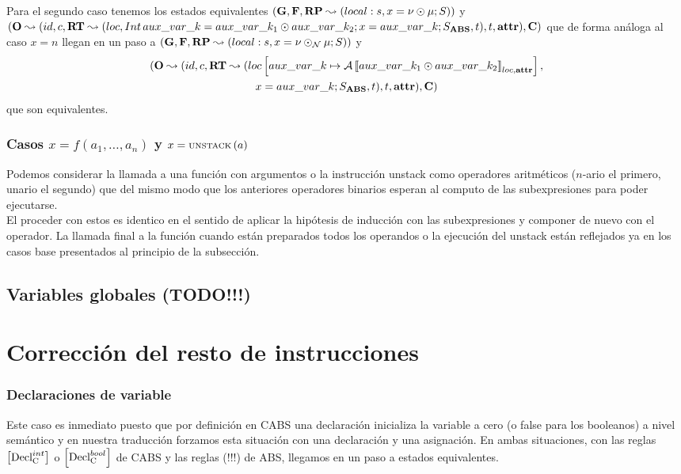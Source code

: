 Para el segundo caso tenemos los estados equivalentes $(\mathbf{G}, \mathbf{F}, \textbf{RP} \leadsto (local:s,x = \nu \odot \mu\mbox{;\,}S))$ y $(\mathbf{O} \leadsto (id, c, \textbf{RT} \leadsto (loc, Int\,aux\_var\_k =  aux\_var\_k_1 \odot  aux\_var\_k_2\mbox{;\,} x = aux\_var\_k\mbox{;\,} S_{\textbf{ABS}}, t), t, \textbf{attr}), \mathbf{C})$ que de forma análoga al caso $x = n$ llegan en un paso a $(\mathbf{G}, \mathbf{F}, \textbf{RP} \leadsto (local:s,x = \nu \odot_{\mathcal{N}} \mu\mbox{;\,}S))$ y
\begin{multline*}
  (\mathbf{O} \leadsto (id, c, \textbf{RT} \leadsto (loc \left[ aux\_var\_k\mapsto\mathcal{A} \left\llbracket aux\_var\_k_1 \odot  aux\_var\_k_2 \right\rrbracket_{loc, \textbf{attr}} \right],\\
  x = aux\_var\_k\mbox{;\,}S_{\textbf{ABS}}, t), t, \textbf{attr}), \mathbf{C})
\end{multline*}
que son equivalentes.

\subsubsection{Casos $x = f(a_1, \dots, a_n)$ y $x = \text{\scriptsize{UNSTACK}}\left(a\right)$}
Podemos considerar la llamada a una función con argumentos o la instrucción unstack como operadores aritméticos ($n$-ario el primero, unario el segundo) que del mismo modo que los anteriores operadores binarios esperan al computo de las subexpresiones para poder ejecutarse.\\

El proceder con estos es identico en el sentido de aplicar la hipótesis de inducción con las subexpresiones y componer de nuevo con el operador. La llamada final a la función cuando están preparados todos los operandos o la ejecución del unstack están reflejados ya en los casos base presentados al principio de la subsección.

\subsection{Variables globales (TODO!!!)}

\section{Corrección del resto de instrucciones}

\subsubsection{Declaraciones de variable}
Este caso es inmediato puesto que por definición en CABS una declaración inicializa la variable a cero (o false para los booleanos) a nivel semántico y en nuestra traducción forzamos esta situación con una declaración y una asignación. En ambas situaciones, con las reglas $\left[ \text{Decl}_{\text{C}}^{int} \right]$ o $\left[ \text{Decl}_{\text{C}}^{bool} \right]$ de CABS y las reglas (!!!) de ABS, llegamos en un paso a estados equivalentes.

